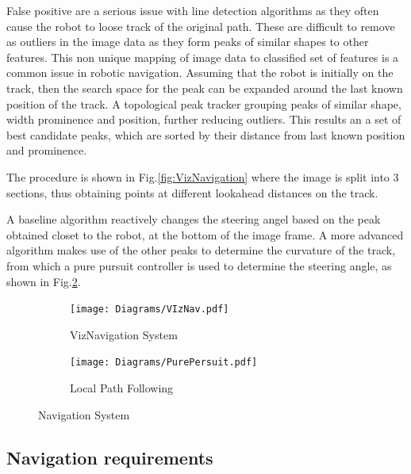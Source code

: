         False positive are a serious issue with line detection algorithms as they often cause the robot to loose track of the original path. 
        These are difficult to remove as outliers in the image data as they form peaks of similar shapes to other features. This non unique mapping 
        of image data to classified set of features is a common issue in robotic navigation. 
        Assuming that the robot is initially on the track, then the search space for the peak can be expanded around the last known position of the track. 
        A topological peak tracker grouping peaks of similar shape, width prominence and position, further reducing outliers. 
        This results an a set of best candidate peaks, which are sorted by their distance from last known position and prominence. 

        The procedure is shown in Fig.\ref{fig:VizNavigation} where the image is split into 3 sections, thus obtaining points at different lookahead distances 
        on the track. 

        A baseline algorithm reactively changes the steering angel based on the peak obtained closet to the robot, at the bottom of the image frame.  
        A more advanced algorithm makes use of the other peaks to determine the curvature of the track, from which a pure pursuit controller is used to
        determine the steering angle, as shown in Fig.\ref{fig:PurePersuit}.




        \begin{figure}[H]
            \centering
            \begin{subfigure}[b]{0.6\textwidth}
                \texttt{[image: Diagrams/VIzNav.pdf]}
                \caption{VizNavigation System}
                \label{fig:Vision}
            \end{subfigure}
            \hfill
            \begin{subfigure}[b]{0.35\textwidth}
                \texttt{[image: Diagrams/PurePersuit.pdf]}
                \caption{Local Path Following}
                \label{fig:PurePersuit}
            \end{subfigure}
            \caption{Navigation System}
            \label{fig:NavigationSystem}
        \end{figure}


        \subsection{Navigation requirements}



